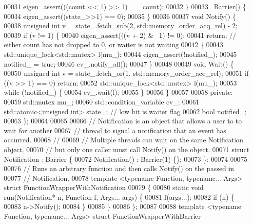 \begin{DoxyCode}
00031     eigen\_assert(((count << 1) >> 1) == count);
00032   \}
00033   ~Barrier() \{
00034     eigen\_assert((state\_>>1) == 0);
00035   \}
00036 
00037   \textcolor{keywordtype}{void} Notify() \{
00038     \textcolor{keywordtype}{unsigned} \textcolor{keywordtype}{int} v = state\_.fetch\_sub(2, std::memory\_order\_acq\_rel) - 2;
00039     \textcolor{keywordflow}{if} (v != 1) \{
00040       eigen\_assert(((v + 2) & ~1) != 0);
00041       \textcolor{keywordflow}{return};  \textcolor{comment}{// either count has not dropped to 0, or waiter is not waiting}
00042     \}
00043     std::unique\_lock<std::mutex> l(mu\_);
00044     eigen\_assert(!notified\_);
00045     notified\_ = \textcolor{keyword}{true};
00046     cv\_.notify\_all();
00047   \}
00048 
00049   \textcolor{keywordtype}{void} Wait() \{
00050     \textcolor{keywordtype}{unsigned} \textcolor{keywordtype}{int} v = state\_.fetch\_or(1, std::memory\_order\_acq\_rel);
00051     \textcolor{keywordflow}{if} ((v >> 1) == 0) \textcolor{keywordflow}{return};
00052     std::unique\_lock<std::mutex> l(mu\_);
00053     \textcolor{keywordflow}{while} (!notified\_) \{
00054       cv\_.wait(l);
00055     \}
00056   \}
00057 
00058  \textcolor{keyword}{private}:
00059   std::mutex mu\_;
00060   std::condition\_variable cv\_;
00061   std::atomic<unsigned int> state\_;  \textcolor{comment}{// low bit is waiter flag}
00062   \textcolor{keywordtype}{bool} notified\_;
00063 \};
00064 
00065 
00066 \textcolor{comment}{// Notification is an object that allows a user to to wait for another}
00067 \textcolor{comment}{// thread to signal a notification that an event has occurred.}
00068 \textcolor{comment}{//}
00069 \textcolor{comment}{// Multiple threads can wait on the same Notification object,}
00070 \textcolor{comment}{// but only one caller must call Notify() on the object.}
00071 \textcolor{keyword}{struct }Notification : Barrier \{
00072   Notification() : Barrier(1) \{\};
00073 \};
00074 
00075 
00076 \textcolor{comment}{// Runs an arbitrary function and then calls Notify() on the passed in}
00077 \textcolor{comment}{// Notification.}
00078 \textcolor{keyword}{template} <\textcolor{keyword}{typename} Function, \textcolor{keyword}{typename}... Args> \textcolor{keyword}{struct }FunctionWrapperWithNotification
00079 \{
00080   \textcolor{keyword}{static} \textcolor{keywordtype}{void} run(Notification* n, Function f, Args... args) \{
00081     f(args...);
00082     \textcolor{keywordflow}{if} (n) \{
00083       n->Notify();
00084     \}
00085   \}
00086 \};
00087 
00088 \textcolor{keyword}{template} <\textcolor{keyword}{typename} Function, \textcolor{keyword}{typename}... Args> \textcolor{keyword}{struct }FunctionWrapperWithBarrier

\end{DoxyCode}
